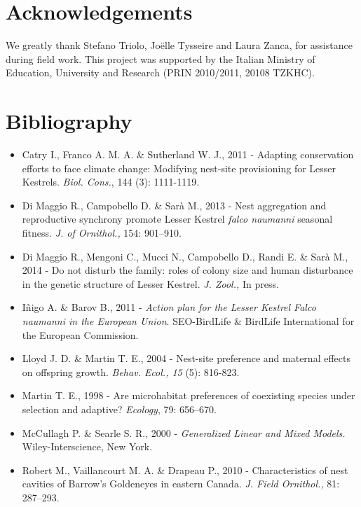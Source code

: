 \newpage
\section*{Acknowledgements}

We greatly thank Stefano Triolo, Jo\"elle Tysseire and Laura Zanca, for
assistance during field work. This project was supported by the Italian
Ministry of Education, University and Research (PRIN 2010/2011, 20108
TZKHC).


\section*{Bibliography}
\begin{itemize}\itemsep0pt
	\item Catry I., Franco A. M. A. \& Sutherland W. J., 2011 - Adapting
conservation efforts to face climate change: Modifying nest-site
provisioning for Lesser Kestrels.\textit{ Biol. Cons.}, 144 (3):
1111-1119.

	\item Di Maggio R., Campobello D. \& Sar\`a M., 2013 - Nest aggregation and
reproductive synchrony promote Lesser Kestrel \textit{falco naumanni}
seasonal fitness.\textit{ J. of Ornithol.,} 154: 901--910.

\item Di Maggio R., Mengoni C., Mucci N., Campobello D., Randi E. \& Sar\`a
M., 2014 - Do not disturb the family: roles of colony size and human
disturbance in the genetic structure of Lesser Kestrel. \textit{J.
Zool., }In press.

	\item I\~nigo A. \& Barov B., 2011 - \textit{Action plan for the Lesser
Kestrel Falco naumanni in the European Union}. SEO-BirdLife \& BirdLife
International for the European Commission.

	\item Lloyd J. D. \& Martin T. E., 2004 - Nest-site preference and maternal
effects on offspring growth.\textit{ Behav. Ecol., 15 }(5): 816-823.

	\item {Martin T. E., 1998 - Are microhabitat preferences of
coexisting species under selection and adaptive?
}\textit{{Ecology}}{, 79: 656--670.}

	\item McCullagh P. \& Searle S. R., 2000 - \textit{Generalized Linear and
Mixed Models.} Wiley-Interscience, New York.

	\item Robert M., Vaillancourt M. A. \& Drapeau P., 2010 - Characteristics of
nest cavities of Barrow{\textquoteright}s Goldeneyes in eastern Canada.
\textit{J. Field Ornithol.,} 81: 287--293.


\end{itemize}
